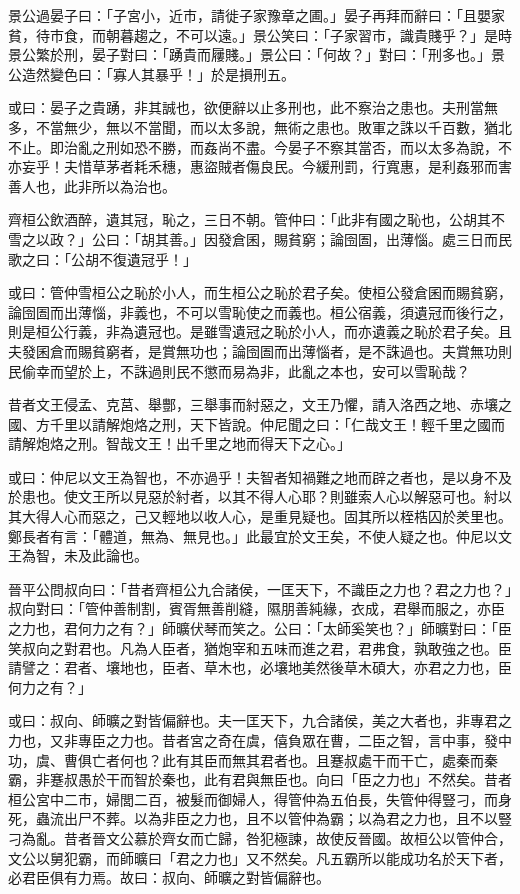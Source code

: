 
\begin{pinyinscope}
景公過晏子曰：「子宮小，近市，請徙子家豫章之圃。」晏子再拜而辭曰：「且嬰家貧，待市食，而朝暮趨之，不可以遠。」景公笑曰：「子家習市，識貴賤乎？」是時景公繁於刑，晏子對曰：「踴貴而屨賤。」景公曰：「何故？」對曰：「刑多也。」景公造然變色曰：「寡人其暴乎！」於是損刑五。

或曰：晏子之貴踴，非其誠也，欲便辭以止多刑也，此不察治之患也。夫刑當無多，不當無少，無以不當聞，而以太多說，無術之患也。敗軍之誅以千百數，猶北不止。即治亂之刑如恐不勝，而姦尚不盡。今晏子不察其當否，而以太多為說，不亦妄乎！夫惜草茅者耗禾穗，惠盜賊者傷良民。今緩刑罰，行寬惠，是利姦邪而害善人也，此非所以為治也。

齊桓公飲酒醉，遺其冠，恥之，三日不朝。管仲曰：「此非有國之恥也，公胡其不雪之以政？」公曰：「胡其善。」因發倉囷，賜貧窮；論囹圄，出薄惱。處三日而民歌之曰：「公胡不復遺冠乎！」

或曰：管仲雪桓公之恥於小人，而生桓公之恥於君子矣。使桓公發倉囷而賜貧窮，論囹圄而出薄惱，非義也，不可以雪恥使之而義也。桓公宿義，須遺冠而後行之，則是桓公行義，非為遺冠也。是雖雪遺冠之恥於小人，而亦遺義之恥於君子矣。且夫發囷倉而賜貧窮者，是賞無功也；論囹圄而出薄惱者，是不誅過也。夫賞無功則民偷幸而望於上，不誅過則民不懲而易為非，此亂之本也，安可以雪恥哉？

昔者文王侵孟、克莒、舉酆，三舉事而紂惡之，文王乃懼，請入洛西之地、赤壤之國、方千里以請解炮烙之刑，天下皆說。仲尼聞之曰：「仁哉文王！輕千里之國而請解炮烙之刑。智哉文王！出千里之地而得天下之心。」

或曰：仲尼以文王為智也，不亦過乎！夫智者知禍難之地而辟之者也，是以身不及於患也。使文王所以見惡於紂者，以其不得人心耶？則雖索人心以解惡可也。紂以其大得人心而惡之，己又輕地以收人心，是重見疑也。固其所以桎梏囚於羑里也。鄭長者有言：「體道，無為、無見也。」此最宜於文王矣，不使人疑之也。仲尼以文王為智，未及此論也。

晉平公問叔向曰：「昔者齊桓公九合諸侯，一匡天下，不識臣之力也？君之力也？」叔向對曰：「管仲善制割，賓胥無善削縫，隰朋善純緣，衣成，君舉而服之，亦臣之力也，君何力之有？」師曠伏琴而笑之。公曰：「太師奚笑也？」師曠對曰：「臣笑叔向之對君也。凡為人臣者，猶炮宰和五味而進之君，君弗食，孰敢強之也。臣請譬之：君者、壤地也，臣者、草木也，必壤地美然後草木碩大，亦君之力也，臣何力之有？」

或曰：叔向、師曠之對皆偏辭也。夫一匡天下，九合諸侯，美之大者也，非專君之力也，又非專臣之力也。昔者宮之奇在虞，僖負眾在曹，二臣之智，言中事，發中功，虞、曹俱亡者何也？此有其臣而無其君者也。且蹇叔處干而干亡，處秦而秦霸，非蹇叔愚於干而智於秦也，此有君與無臣也。向曰「臣之力也」不然矣。昔者桓公宮中二市，婦閭二百，被髮而御婦人，得管仲為五伯長，失管仲得豎刁，而身死，蟲流出尸不葬。以為非臣之力也，且不以管仲為霸；以為君之力也，且不以豎刁為亂。昔者晉文公慕於齊女而亡歸，咎犯極諫，故使反晉國。故桓公以管仲合，文公以舅犯霸，而師曠曰「君之力也」又不然矣。凡五霸所以能成功名於天下者，必君臣俱有力焉。故曰：叔向、師曠之對皆偏辭也。


\end{pinyinscope}
